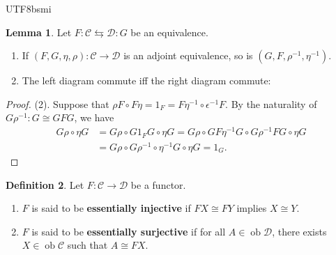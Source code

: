 \documentclass[12pt]{article}
\theoremstyle{definition}
\newtheorem{definition}{Definition}[section]
\newtheorem{lemma}[definition]{Lemma}
\newcommand\<{\langle}
\renewcommand\>{\rangle}
\DeclareMathOperator{\ob}{ob}
\begin{document}
\begin{CJK}{UTF8}{bsmi}
\begin{lemma}
    Let $F:\mathcal{C}\leftrightarrows\mathcal{D}:G$ be an equivalence.
    \begin{enumerate}
        \item If $(F, G, \eta, \rho):\mathcal{C}\to\mathcal{D}$ is an adjoint equivalence, so is $(G, F, \rho^{-1}, \eta^{-1})$.
        \item The left diagram commute iff the right diagram commute:
        \begin{center}
        \end{center}
    \end{enumerate}
\end{lemma}
\begin{proof}
    (2).
    Suppose that $\rho F\circ F\eta=1_F=F\eta^{-1}\circ\epsilon^{-1}F$.
    By the naturality of $G\rho^{-1}:G\cong GFG$, we have
    \begin{align*}
        G\rho \circ \eta G
        & = G\rho \circ G1_FG \circ \eta G
          = G\rho \circ GF\eta^{-1}G \circ G\rho^{-1}FG \circ \eta G \\
        & = G\rho \circ G\rho^{-1} \circ \eta^{-1}G \circ \eta G
          = 1_G.
    \end{align*}
\end{proof}

\begin{definition}
    Let $F:\mathcal{C}\to\mathcal{D}$ be a functor.
    \begin{enumerate}
        \item $F$ is said to be \textbf{essentially injective} if $FX\cong FY$ implies $X\cong Y$.
        \item $F$ is said to be \textbf{essentially surjective} if for all $A\in\ob\mathcal{D}$, there exists $X\in\ob\mathcal{C}$ such that $A\cong FX$.
    \end{enumerate}
\end{definition}


\end{CJK}
\end{document}
